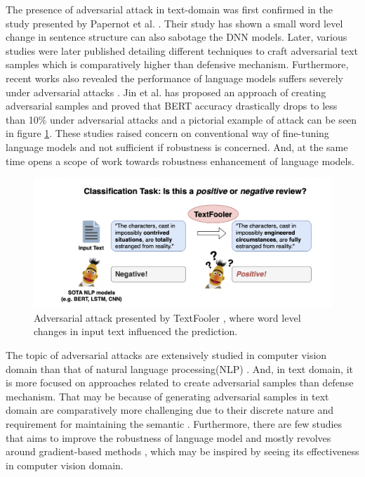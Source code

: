 \documentclass[%
	BCOR=8mm, %
	DIV=12,
	toc=bibliography, %
	toc=listof, %
	oneside, %
	egregdoesnotlikesansseriftitles, %
	]{scrbook}
\begin{document}
The presence of adversarial attack in text-domain was first confirmed in the study presented by Papernot et al. \cite{papernot_crafting_2016}. Their  study has shown  a small word level change in sentence structure can also sabotage the DNN models. Later, various studies were later published detailing different techniques to craft adversarial text samples which is comparatively higher than defensive mechanism.  Furthermore,  recent works also revealed the performance  of language models suffers severely under adversarial attacks \cite{li_bert-attack_2020,garg_bae_2020}.  Jin et al. \cite{jin_is_2020} has proposed an approach of creating adversarial samples and proved that BERT accuracy drastically drops to less than 10\% under adversarial attacks and a pictorial example of attack can be seen in figure \ref{diag:ExampleAdversarial}. These studies raised concern on conventional way of fine-tuning language models and not sufficient if robustness is concerned. And, at the same time opens a scope of work towards robustness enhancement of language models.\\
\begin{figure}[h!]
    \centering
    \includegraphics[width=.80\textwidth]{img/Introduction-Fig-1.png}
    \caption[Example of Adversarial attack in text-domain]{Adversarial attack presented by TextFooler \cite{jin_is_2020}, where word level changes in input text influenced the prediction.}
    \label{diag:ExampleAdversarial}
\end{figure}
The topic of adversarial attacks are extensively studied in computer vision domain than that of natural language processing(NLP) \cite{wang_towards_2021}. And, in text domain, it is more focused on approaches related to create adversarial samples than defense mechanism. That may be because of generating adversarial samples in text domain are comparatively more challenging due to their discrete nature and requirement for maintaining the semantic \cite{li_bert-attack_2020}. Furthermore, there are few studies that aims to improve the robustness of language model and mostly revolves around gradient-based methods \cite{zhu_at-bert_2021,miyato_adversarial_2017,jiang_smart_2020-1}, which may be inspired by seeing its effectiveness in computer vision domain.\\
\end{document}
